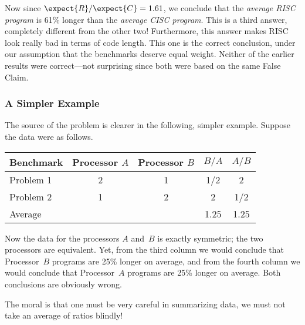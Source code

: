 \begin{editingnotes}
Now since $\expect{R}/\expect{C} = 1.61$, we conclude that the
\emph{average RISC program} is 61\% longer than the \emph{average CISC
  program}.  This is a third answer, completely different from the
other two!  Furthermore, this answer makes RISC look really bad in
terms of code length.  This one is the correct conclusion, under our
assumption that the benchmarks deserve equal weight.  Neither of the
earlier results were correct---not surprising since both were based on
the same False Claim.


\subsubsection{A Simpler Example}

The source of the problem is clearer in the following, simpler
example.  Suppose the data were as follows.
\begin{center}
\begin{tabular}{lcccc}
Benchmark   & Processor $A$ & Processor $B$ & $B / A$   & $A / B$  \\
\hline
Problem 1   & 2             & 1             & 1/2       & 2 \\
Problem 2   & 1             & 2             & 2         & 1/2 \\
\hline
Average     &               &               & 1.25      & 1.25
\end{tabular}
\end{center}

Now the data for the processors $A$ and~$B$ is exactly symmetric; the
two processors are equivalent.  Yet, from the third column we would
conclude that Processor~$B$ programs are 25\% longer on average, and
from the fourth column we would conclude that Processor~$A$ programs
are 25\% longer on average.  Both conclusions are obviously wrong.

The moral is that one must be very careful in summarizing data, we must
not take an average of ratios blindly!


\end{editingnotes}

